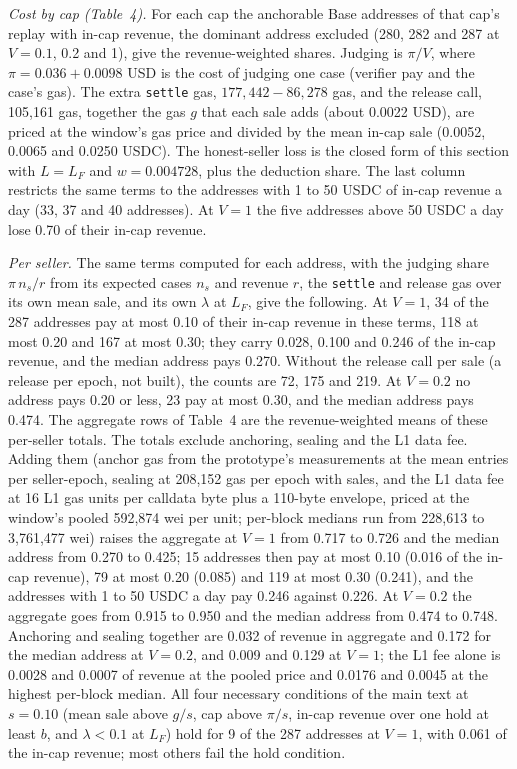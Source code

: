 \documentclass[10pt,a4paper]{article}
\theoremstyle{plain}
\theoremstyle{remark}
\begin{document}
\emph{Cost by cap (Table~4).} For each cap the anchorable Base addresses of that cap's replay with in-cap revenue, the dominant address excluded (280, 282 and 287 at $V=0.1$, 0.2 and 1), give the revenue-weighted shares. Judging is $\pi/V$, where $\pi=0.036+0.0098$ USD is the cost of judging one case (verifier pay and the case's gas). The extra \texttt{settle} gas, $177{,}442-86{,}278$ gas, and the release call, 105,161 gas, together the gas $g$ that each sale adds (about 0.0022 USD), are priced at the window's gas price and divided by the mean in-cap sale (0.0052, 0.0065 and 0.0250 USDC). The honest-seller loss is the closed form of this section with $L=L_F$ and $w=0.004728$, plus the deduction share. The last column restricts the same terms to the addresses with 1 to 50 USDC of in-cap revenue a day (33, 37 and 40 addresses). At $V=1$ the five addresses above 50 USDC a day lose 0.70 of their in-cap revenue.

\emph{Per seller.} The same terms computed for each address, with the judging share $\pi\,n_s/r$ from its expected cases $n_s$ and revenue $r$, the \texttt{settle} and release gas over its own mean sale, and its own $\lambda$ at $L_F$, give the following. At $V=1$, 34 of the 287 addresses pay at most 0.10 of their in-cap revenue in these terms, 118 at most 0.20 and 167 at most 0.30; they carry 0.028, 0.100 and 0.246 of the in-cap revenue, and the median address pays 0.270. Without the release call per sale (a release per epoch, not built), the counts are 72, 175 and 219. At $V=0.2$ no address pays 0.20 or less, 23 pay at most 0.30, and the median address pays 0.474. The aggregate rows of Table~4 are the revenue-weighted means of these per-seller totals. The totals exclude anchoring, sealing and the L1 data fee. Adding them (anchor gas from the prototype's measurements at the mean entries per seller-epoch, sealing at 208,152 gas per epoch with sales, and the L1 data fee at 16 L1 gas units per calldata byte plus a 110-byte envelope, priced at the window's pooled 592,874 wei per unit; per-block medians run from 228,613 to 3,761,477 wei) raises the aggregate at $V=1$ from 0.717 to 0.726 and the median address from 0.270 to 0.425; 15 addresses then pay at most 0.10 (0.016 of the in-cap revenue), 79 at most 0.20 (0.085) and 119 at most 0.30 (0.241), and the addresses with 1 to 50 USDC a day pay 0.246 against 0.226. At $V=0.2$ the aggregate goes from 0.915 to 0.950 and the median address from 0.474 to 0.748. Anchoring and sealing together are 0.032 of revenue in aggregate and 0.172 for the median address at $V=0.2$, and 0.009 and 0.129 at $V=1$; the L1 fee alone is 0.0028 and 0.0007 of revenue at the pooled price and 0.0176 and 0.0045 at the highest per-block median.  All four necessary conditions of the main text at $s=0.10$ (mean sale above $g/s$, cap above $\pi/s$, in-cap revenue over one hold at least $b$, and $\lambda<0.1$ at $L_F$) hold for 9 of the 287 addresses at $V=1$, with 0.061 of the in-cap revenue; most others fail the hold condition.
\end{document}
